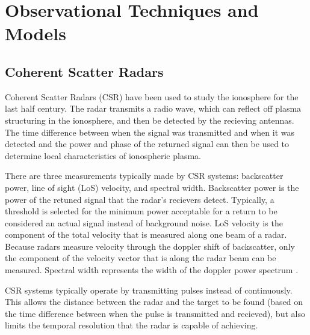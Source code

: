 \section{Observational Techniques and Models}


\subsection{Coherent Scatter Radars}
\label{sec:csr}
Coherent Scatter Radars (CSR) have been used to study the ionosphere for the last half century.  The radar transmits a radio wave, which can reflect off plasma structuring in the ionosphere, and then be detected by the recieving antennas.  The time difference between when the signal was transmitted and when it was detected and the power and phase of the returned signal can then be used to determine local characteristics of ionospheric plasma.

There are three measurements typically made by CSR systems: backscatter power, line of sight (LoS) velocity, and spectral width.  Backscatter power is the power of the retuned signal that the radar's recievers detect.  Typically, a threshold is selected for the minimum power acceptable for a return to be considered an actual signal instead of background noise.  LoS velocity is the component of the total velocity that is measured along one beam of a radar.  Because radars measure velocity through the doppler shift of backscatter, only the component of the velocity vector that is along the radar beam can be measured.  Spectral width represents the width of the doppler power spectrum \citep{Greenwald1985}.

CSR systems typically operate by transmitting pulses instead of continuously.  This allows the distance between the radar and the target to be found (based on the time difference between when the pulse is transmitted and recieved), but also limits the temporal resolution that the radar is capable of achieving.


